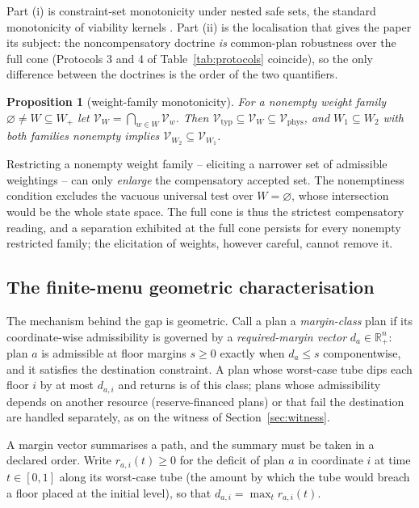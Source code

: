 \documentclass[preprint,11pt,authoryear]{elsarticle}
\newtheorem{proposition}{Proposition}
\theoremstyle{definition}
\theoremstyle{remark}
\newcommand{\Vtyp}{\mathcal{V}_{\mathrm{typ}}}
\newcommand{\Vphys}{\mathcal{V}_{\mathrm{phys}}}
\newcommand{\Wp}{W_+}
\newcommand{\Rp}{\mathbb{R}^n_+}
\begin{document}
Part (i) is constraint-set monotonicity under nested safe sets, the standard monotonicity of viability kernels \citep{Aubin1991,Frankowska1989}. Part (ii) is the localisation that gives the paper its subject: the noncompensatory doctrine \emph{is} common-plan robustness over the full cone (Protocols 3 and 4 of Table~\ref{tab:protocols} coincide), so the only difference between the doctrines is the order of the two quantifiers.

\begin{proposition}[weight-family monotonicity]\label{prop:monotone}
For a nonempty weight family $\varnothing\ne W\subseteq\Wp$ let $\mathcal V_W=\bigcap_{w\in W}\mathcal V_w$. Then $\Vtyp\subseteq\mathcal V_W\subseteq\Vphys$, and $W_1\subseteq W_2$ with both families nonempty implies $\mathcal V_{W_2}\subseteq\mathcal V_{W_1}$.
\end{proposition}

Restricting a nonempty weight family -- eliciting a narrower set of admissible weightings -- can only \emph{enlarge} the compensatory accepted set. The nonemptiness condition excludes the vacuous universal test over $W=\varnothing$, whose intersection would be the whole state space. The full cone is thus the strictest compensatory reading, and a separation exhibited at the full cone persists for every nonempty restricted family; the elicitation of weights, however careful, cannot remove it.

\subsection{The finite-menu geometric characterisation}

The mechanism behind the gap is geometric. Call a plan a \emph{margin-class} plan if its coordinate-wise admissibility is governed by a \emph{required-margin vector} $d_a\in\Rp$: plan $a$ is admissible at floor margins $s\ge0$ exactly when $d_a\le s$ componentwise, and it satisfies the destination constraint. A plan whose worst-case tube dips each floor $i$ by at most $d_{a,i}$ and returns is of this class; plans whose admissibility depends on another resource (reserve-financed plans) or that fail the destination are handled separately, as on the witness of Section~\ref{sec:witness}.

A margin vector summarises a path, and the summary must be taken in a declared order. Write $r_{a,i}(t)\ge0$ for the deficit of plan $a$ in coordinate $i$ at time $t\in[0,1]$ along its worst-case tube (the amount by which the tube would breach a floor placed at the initial level), so that $d_{a,i}=\max_t r_{a,i}(t)$.
\end{document}
